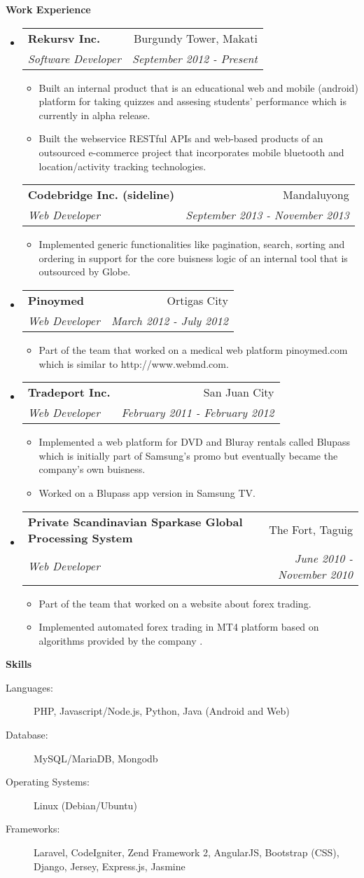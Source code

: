 \documentclass[letterpaper,11pt]{article}
\makeatletter
\newcommand{\resitem}[1]{\item #1 \vspace{-2pt}}
\newcommand{\resheading}[1]{{\large \colorbox{mygrey}{\begin{minipage}{\textwidth}{\textbf{#1 \vphantom{p\^{E}}}}\end{minipage}}}}
\newcommand{\ressubheading}[4]{
\begin{tabular*}{7.0in}{l@{\extracolsep{\fill}}r}
		\textbf{#1} & #2 \\
		\textit{#3} & \textit{#4} \\
\end{tabular*}\vspace{-6pt}}
\makeatother
\begin{document}
\resheading{Work Experience}
\begin{itemize}
\item
	\ressubheading{Rekursv Inc.}{Burgundy Tower, Makati}{Software Developer}{September 2012 - Present}
	\begin{itemize}
        \resitem{Built an internal product that is an educational web and mobile (android) platform for taking quizzes and assesing students' performance which is currently in alpha release.}
		\resitem{Built the webservice RESTful APIs and web-based products of an outsourced e-commerce project that incorporates mobile bluetooth and location/activity tracking technologies.}
	\end{itemize}
    \ressubheading{Codebridge Inc. (sideline)}{Mandaluyong}{Web Developer}{September 2013 - November 2013}
	\begin{itemize}
		\resitem{Implemented generic functionalities like pagination, search, sorting and ordering in support for the core buisness logic of an internal tool that is outsourced by Globe.}
	\end{itemize}
\item
    \ressubheading{Pinoymed}{Ortigas City}{Web Developer}{March 2012 - July 2012}
	\begin{itemize}
		\resitem{Part of the team that worked on a medical web platform pinoymed.com which is similar to http://www.webmd.com.}
	\end{itemize}
\item
	\ressubheading{Tradeport Inc.}{San Juan City}{Web Developer}{February 2011 - February 2012}
	\begin{itemize}
		\resitem{Implemented a web platform for DVD and Bluray rentals called Blupass which is initially part of Samsung's promo but eventually became the company's own buisness.}
		\resitem{Worked on a Blupass app version in Samsung TV.}
	\end{itemize}
\item
	\ressubheading{Private Scandinavian Sparkase Global Processing System}{The Fort, Taguig}{Web Developer}{June 2010 - November 2010}
	\begin{itemize}
		\resitem{Part of the team that worked on a website about forex trading.}
		\resitem{Implemented automated forex trading in MT4 platform based on algorithms provided by the company .}
	\end{itemize}
\end{itemize}

\resheading{Skills}

\begin{description}
\item[Languages:]
PHP, Javascript/Node.js, Python, Java (Android and Web)
\item[Database:]
MySQL/MariaDB, Mongodb
\item[Operating Systems:]
Linux (Debian/Ubuntu)
\item[Frameworks:]
Laravel, CodeIgniter, Zend Framework 2, AngularJS, Bootstrap (CSS), Django, Jersey, Express.js, Jasmine
\end{description}

\pagebreak
\end{document}
